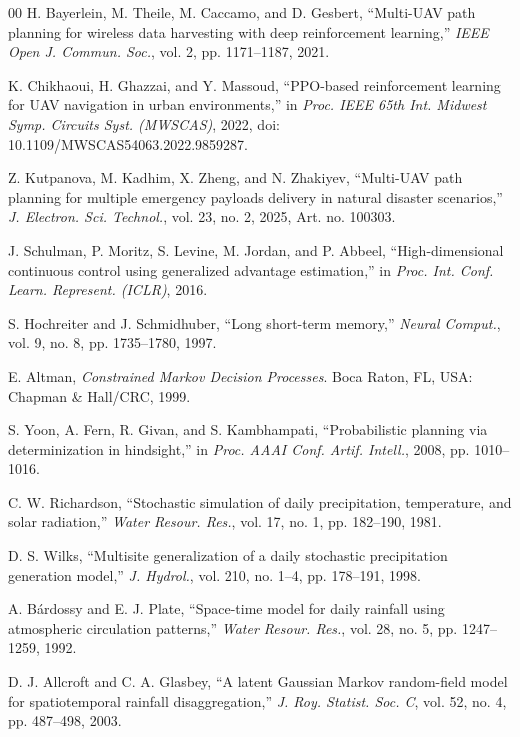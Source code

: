 \documentclass{ieeeaccess}
\begin{document}
\begin{thebibliography}{00}
 H. Bayerlein, M. Theile, M. Caccamo, and D. Gesbert, ``Multi-UAV path planning for wireless data harvesting with deep reinforcement learning,'' \emph{IEEE Open J. Commun. Soc.}, vol. 2, pp. 1171--1187, 2021.

 K. Chikhaoui, H. Ghazzai, and Y. Massoud, ``PPO-based reinforcement learning for UAV navigation in urban environments,'' in \emph{Proc. IEEE 65th Int. Midwest Symp. Circuits Syst. (MWSCAS)}, 2022, doi: 10.1109/MWSCAS54063.2022.9859287.

 Z. Kutpanova, M. Kadhim, X. Zheng, and N. Zhakiyev, ``Multi-UAV path planning for multiple emergency payloads delivery in natural disaster scenarios,'' \emph{J. Electron. Sci. Technol.}, vol. 23, no. 2, 2025, Art. no. 100303.

 J. Schulman, P. Moritz, S. Levine, M. Jordan, and P. Abbeel, ``High-dimensional continuous control using generalized advantage estimation,'' in \emph{Proc. Int. Conf. Learn. Represent. (ICLR)}, 2016.

 S. Hochreiter and J. Schmidhuber, ``Long short-term memory,'' \emph{Neural Comput.}, vol. 9, no. 8, pp. 1735--1780, 1997.

 E. Altman, \emph{Constrained Markov Decision Processes}. Boca Raton, FL, USA: Chapman \& Hall/CRC, 1999.

 S. Yoon, A. Fern, R. Givan, and S. Kambhampati, ``Probabilistic planning via determinization in hindsight,'' in \emph{Proc. AAAI Conf. Artif. Intell.}, 2008, pp. 1010--1016.

 C. W. Richardson, ``Stochastic simulation of daily precipitation, temperature, and solar radiation,'' \emph{Water Resour. Res.}, vol. 17, no. 1, pp. 182--190, 1981.

 D. S. Wilks, ``Multisite generalization of a daily stochastic precipitation generation model,'' \emph{J. Hydrol.}, vol. 210, no. 1--4, pp. 178--191, 1998.

 A. B\'{a}rdossy and E. J. Plate, ``Space-time model for daily rainfall using atmospheric circulation patterns,'' \emph{Water Resour. Res.}, vol. 28, no. 5, pp. 1247--1259, 1992.

 D. J. Allcroft and C. A. Glasbey, ``A latent Gaussian Markov random-field model for spatiotemporal rainfall disaggregation,'' \emph{J. Roy. Statist. Soc. C}, vol. 52, no. 4, pp. 487--498, 2003.


\end{thebibliography}
\end{document}
